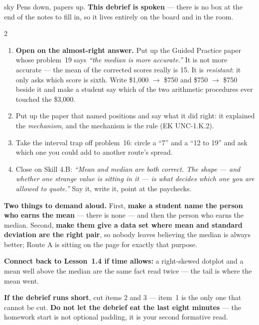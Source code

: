 \documentclass[10pt]{article}
\begin{document}
\boxguard
\begin{skillbox}{sky}
Pens down, papers up. \textbf{This debrief is spoken} --- there is no box at the end of the
notes to fill in, so it lives entirely on the board and in the room.
\begin{multicols}{2}
\begin{enumerate}[leftmargin=1.3em, nosep, itemsep=3pt]
  \item \textbf{Open on the almost-right answer.} Put up the Guided Practice paper whose
        problem~19 says \emph{``the median is more accurate.''} It is not more accurate --- the mean of the
        corrected scores really is 15. It is \emph{resistant}: it only asks which score is
        sixth. Write \$1{,}000 $\to$ \$750 and \$750 $\to$ \$750 beside it and make a student
        say which of the two arithmetic procedures ever touched the \$3{,}000.
  \item Put up the paper that named positions and say what it did right: it explained the
        \emph{mechanism}, and the mechanism is the rule (EK UNC-1.K.2).
  \item Take the interval trap off problem~16: circle a ``7'' and a ``12 to 19'' and ask which one
        you could add to another route's spread.
  \item Close on Skill 4.B: \emph{``Mean and median are both correct. The shape --- and whether
        one strange value is sitting in it --- is what decides which one you are allowed to
        quote.''} Say it, write it, point at the paychecks.
\end{enumerate}
\columnbreak
\textbf{Two things to demand aloud.} First, \textbf{make a student name the person who earns the
mean} --- there is none --- and then the person who earns the median. Second, \textbf{make them
give a data set where mean and standard deviation are the right pair}, so nobody leaves
believing the median is always better; Route A is sitting on the page for exactly that purpose.

\textbf{Connect back to Lesson~1.4 if time allows:} a right-skewed dotplot and a mean well above
the median are the same fact read twice --- the tail is where the mean went.

\textbf{If the debrief runs short}, cut items 2 and 3 --- item~1 is the only one that cannot be
cut. \textbf{Do not let the debrief eat the last eight minutes} --- the homework start is not
optional padding, it is your second formative read.
\end{multicols}
\end{skillbox}
\end{document}
